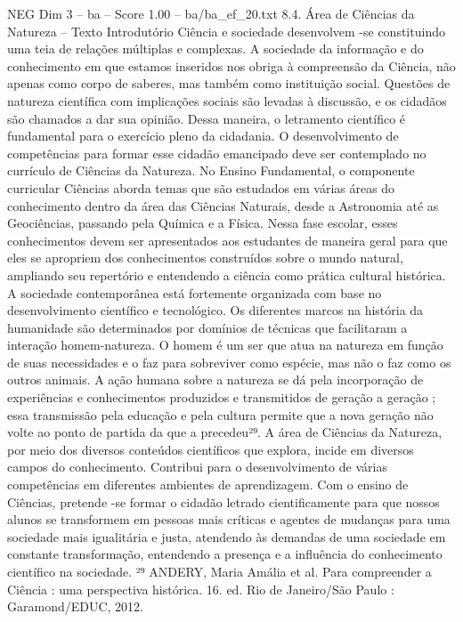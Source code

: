 \begin{textsample}{NEG Dim 3 – ba – Score 1.00 – ba/ba\_ef\_20.txt}  \label{ex:f3_neg_118}
8.4.
Área de Ciências da Natureza – Texto Introdutório Ciência e sociedade desenvolvem -se constituindo uma teia de relações múltiplas e complexas.
A sociedade da informação e do conhecimento em que estamos inseridos nos obriga à compreensão da Ciência, não apenas como corpo de saberes, mas também como instituição social.
Questões de natureza científica com implicações sociais são levadas à discussão, e os cidadãos são chamados a dar sua opinião.
Dessa maneira, o letramento científico é fundamental para o exercício pleno da cidadania.
O desenvolvimento de competências para formar esse cidadão emancipado deve ser contemplado no currículo de Ciências da Natureza.
No Ensino Fundamental, o componente curricular Ciências aborda temas que são estudados em várias áreas do conhecimento dentro da área das Ciências Naturais, desde a Astronomia até as Geociências, passando pela Química e a Física.
Nessa fase escolar, esses conhecimentos devem ser apresentados aos estudantes de maneira geral para que eles se apropriem dos conhecimentos construídos sobre o mundo natural, ampliando seu repertório e entendendo a ciência como prática cultural histórica.
A sociedade contemporânea está fortemente organizada com base no desenvolvimento científico e tecnológico.
Os diferentes marcos na história da humanidade são determinados por domínios de técnicas que facilitaram a interação homem-natureza.
O homem é um ser que atua na natureza em função de suas necessidades e o faz para sobreviver como espécie, mas não o faz como os outros animais.
A ação humana sobre a natureza se dá pela incorporação de experiências e conhecimentos produzidos e transmitidos de geração a geração ; essa transmissão pela educação e pela cultura permite que a nova geração não volte ao ponto de partida da que a precedeu²⁹.
A área de Ciências da Natureza, por meio dos diversos conteúdos científicos que explora, incide em diversos campos do conhecimento.
Contribui para o desenvolvimento de várias competências em diferentes ambientes de aprendizagem.
Com o ensino de Ciências, pretende -se formar o cidadão letrado cientificamente para que nossos alunos se transformem em pessoas mais críticas e agentes de mudanças para uma sociedade mais igualitária e justa, atendendo às demandas de uma sociedade em constante transformação, entendendo a presença e a influência do conhecimento científico na sociedade. ²⁹ ANDERY, Maria Amália et al.
Para compreender a Ciência : uma perspectiva histórica. 16. ed.
Rio de Janeiro/São Paulo : Garamond/EDUC, 2012.

\end{textsample}
